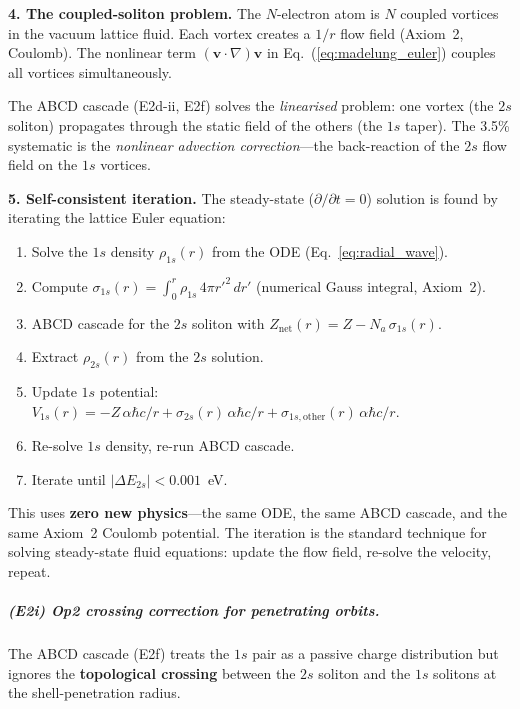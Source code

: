 \noindent\textbf{4. The coupled-soliton problem.}
The $N$-electron atom is $N$ coupled vortices
in the vacuum lattice fluid.  Each vortex
creates a $1/r$ flow field (Axiom~2, Coulomb).
The nonlinear term
$(\mathbf{v} \cdot \nabla)\mathbf{v}$
in Eq.~(\ref{eq:madelung_euler}) couples all
vortices simultaneously.

The ABCD cascade (E2d-ii, E2f) solves the
\emph{linearised} problem: one vortex (the $2s$
soliton) propagates through the static field
of the others (the $1s$ taper).  The 3.5\%
systematic is the \emph{nonlinear advection
correction}---the back-reaction of the $2s$
flow field on the $1s$ vortices.

\noindent\textbf{5. Self-consistent iteration.}
The steady-state ($\partial/\partial t = 0$)
solution is found by iterating the lattice
Euler equation:
\begin{enumerate}
    \item Solve the $1s$ density
          $\rho_{1s}(r)$ from the ODE
          (Eq.~\ref{eq:radial_wave}).
    \item Compute
          $\sigma_{1s}(r) = \int_0^r
          \rho_{1s}\,4\pi r'^2\,dr'$
          (numerical Gauss integral,
          Axiom~2).
    \item ABCD cascade for the $2s$ soliton
          with $Z_{\text{net}}(r) = Z -
          N_a\,\sigma_{1s}(r)$.
    \item Extract $\rho_{2s}(r)$ from the
          $2s$ solution.
    \item Update $1s$ potential:
          $V_{1s}(r) = -Z\,\alpha\hbar c/r
          + \sigma_{2s}(r)\,\alpha\hbar c/r
          + \sigma_{1s,\text{other}}(r)\,
          \alpha\hbar c/r$.
    \item Re-solve $1s$ density, re-run
          ABCD cascade.
    \item Iterate until
          $|\Delta E_{2s}| < 0.001$~eV.
\end{enumerate}
This uses \textbf{zero new physics}---the same
ODE, the same ABCD cascade, and the same
Axiom~2 Coulomb potential.  The iteration is
the standard technique for solving steady-state
fluid equations: update the flow field,
re-solve the velocity, repeat.

\subparagraph{(E2i) Op2 crossing correction for
penetrating orbits.}

The ABCD cascade (E2f) treats the $1s$ pair
as a passive charge distribution but ignores
the \textbf{topological crossing} between the
$2s$ soliton and the $1s$ solitons at the
shell-penetration radius.

